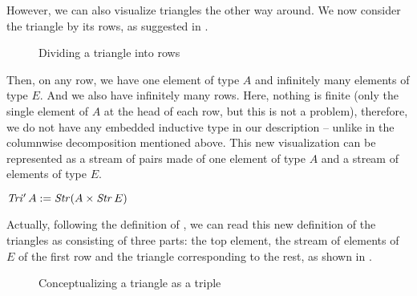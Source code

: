 However, we can also visualize triangles the other way around. We now consider
the triangle by its rows, as suggested in .  
\begin{figure}[h]
  \centering
  \vspace{-3ex}
  \caption{Dividing a triangle into rows}
  \label{fig:visu_row}
\end{figure}
Then, on any row, we have one element of type $A$ and infinitely many
elements of type $E$. And we also have infinitely many rows. Here,
nothing is finite (only the single element of $A$ at the head of each
row, but this is not a problem), therefore, we do not have any
embedded inductive type in our description -- unlike in the columnwise
decomposition mentioned above. This new visualization can be
represented as a stream of pairs made of one element of type $A$ and a
stream of elements of type $E$.

\begin{definition}
  $\mathit{Tri'}\,A := \mathit{Str} (A \times \mathit{Str}\,E)$
\end{definition}
Actually, following the definition of \Str{}, we can read this new definition of the triangles as
consisting of three parts: the top element, the stream of elements of
$E$ of the first row and the triangle corresponding to the rest, as
shown in .
\begin{figure}[h]
  \centering
  \vspace{-3ex}
  \caption{Conceptualizing a triangle as a triple}
  \label{fig:3elems}
\end{figure}

